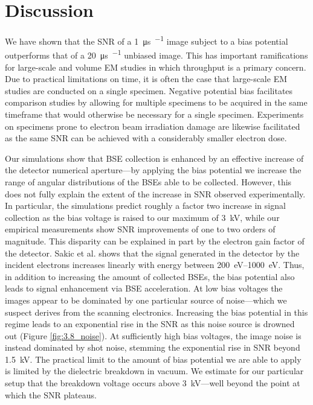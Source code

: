 \section{Discussion}
\label{sec:3.3_discussion}

We have shown that the SNR of a \SI{1}{\micro\second\per\pixel} image subject to a bias potential outperforms that of a \SI{20}{\micro\second\per\pixel} unbiased image. This has important ramifications for large-scale and volume EM studies in which throughput is a primary concern. Due to practical limitations on time, it is often the case that large-scale EM studies are conducted on a single specimen. Negative potential bias facilitates comparison studies by allowing for multiple specimens to be acquired in the same timeframe that would otherwise be necessary for a single specimen. Experiments on specimens prone to electron beam irradiation damage are likewise facilitated as the same SNR can be achieved with a considerably smaller electron dose.

Our simulations show that BSE collection is enhanced by an effective increase of the detector numerical aperture—by applying the bias potential we increase the range of angular distributions of the BSEs able to be collected. However, this does not fully explain the extent of the increase in SNR observed experimentally. In particular, the simulations predict roughly a factor two increase in signal collection as the bias voltage is raised to our maximum of \SI{3}{\kilo\volt}, while our empirical measurements show SNR improvements of one to two orders of magnitude. This disparity can be explained in part by the electron gain factor of the detector. Sakic et al. \cite{vsakic2011boron} shows that the signal generated in the detector by the incident electrons increases linearly with energy between \SIrange{200}{1000}{\electronvolt}. Thus, in addition to increasing the amount of collected BSEs, the bias potential also leads to signal enhancement via BSE acceleration. At low bias voltages the images appear to be dominated by one particular source of noise---which we suspect derives from the scanning electronics. Increasing the bias potential in this regime leads to an exponential rise in the SNR as this noise source is drowned out (Figure \ref{fig:3.8_noise}). At sufficiently high bias voltages, the image noise is instead dominated by shot noise, stemming the exponential rise in SNR beyond \SI{1.5}{\kilo\volt}. The practical limit to the amount of bias potential we are able to apply is limited by the dielectric breakdown in vacuum. We estimate for our particular setup that the breakdown voltage occurs above \SI{3}{\kilo\volt}---well beyond the point at which the SNR plateaus.

